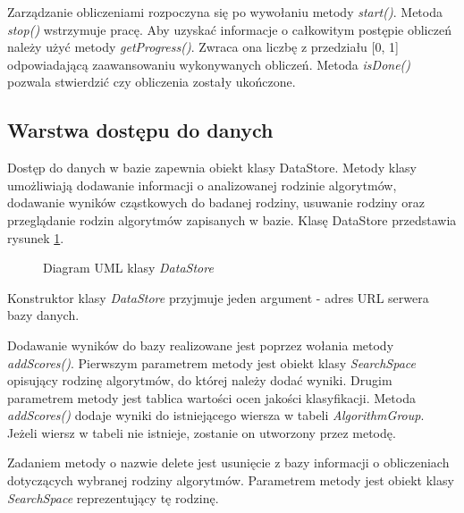 \documentclass[../thesis.tex]{subfiles}
\begin{document}
Zarządzanie obliczeniami rozpoczyna się po wywołaniu metody \emph{start()}. Metoda \emph{stop()} wstrzymuje pracę. Aby uzyskać informacje o całkowitym postępie obliczeń należy użyć metody \emph{getProgress()}. Zwraca ona liczbę z przedziału [0, 1] odpowiadającą zaawansowaniu wykonywanych obliczeń. Metoda \emph{isDone()} pozwala stwierdzić czy obliczenia zostały ukończone.

\subsection{Warstwa dostępu do danych}

Dostęp do danych w bazie zapewnia obiekt klasy DataStore. Metody klasy umożliwiają dodawanie informacji o analizowanej rodzinie algorytmów, dodawanie wyników cząstkowych do badanej rodziny, usuwanie rodziny oraz przeglądanie rodzin algorytmów zapisanych w bazie. Klasę DataStore przedstawia rysunek \ref{proj:diagram_data_store}.

\begin{figure}[h]
\centering
{}
\caption{Diagram UML klasy \emph{DataStore}}
\label{proj:diagram_data_store}
\end{figure}

Konstruktor klasy \emph{DataStore} przyjmuje jeden argument - adres URL serwera bazy danych.

Dodawanie wyników do bazy realizowane jest poprzez wołania metody \emph{addScores()}. Pierwszym parametrem metody jest obiekt klasy \emph{SearchSpace} opisujący rodzinę algorytmów, do której należy dodać wyniki. Drugim parametrem metody jest tablica wartości ocen jakości klasyfikacji. Metoda \emph{addScores()} dodaje wyniki do istniejącego wiersza w tabeli \emph{AlgorithmGroup}. Jeżeli wiersz w tabeli nie istnieje, zostanie on utworzony przez metodę.

Zadaniem metody o nazwie delete jest usunięcie z bazy informacji o obliczeniach dotyczących wybranej rodziny algorytmów. Parametrem metody jest obiekt klasy \emph{SearchSpace} reprezentujący tę rodzinę.
\end{document}
